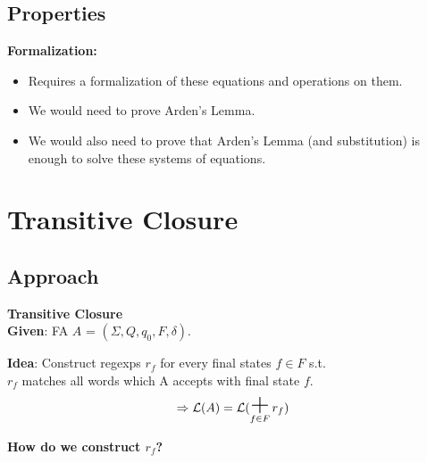 \documentclass{beamer}
\DeclareMathOperator*{\bigplus}{\mbox{\huge +}}
\begin{document}
\subsection*{Properties}
\begin{frame}
    \textbf{Formalization:} \\
    \begin{itemize}
        \item
            Requires a formalization of these equations and operations on them. 
        \item
            We would need to prove Arden's Lemma.
        \item
            We would also need to prove that Arden's Lemma (and substitution) is enough to solve these systems of equations.
    \end{itemize} 
\end{frame}

\section{Transitive Closure}
\subsection*{Approach}
\begin{frame}

    \large{\textbf{Transitive Closure}} \\

    \textbf{Given}: FA $A$ = $(\Sigma, Q, q_0, F, \delta)$.

    \textbf{Idea}: Construct regexps $r_f$ for every final states $f \in F$ s.t. \\$r_f$ matches all words which A accepts with final state $f$. \\

    \[
        \, \Rightarrow \mathcal{L}(A) = \mathcal{L}(\bigplus\limits_{f \in F} r_f)
    \]

    \vspace{5 mm}

    \textbf{How do we construct $r_f$?} 

\end{frame}
\end{document}
